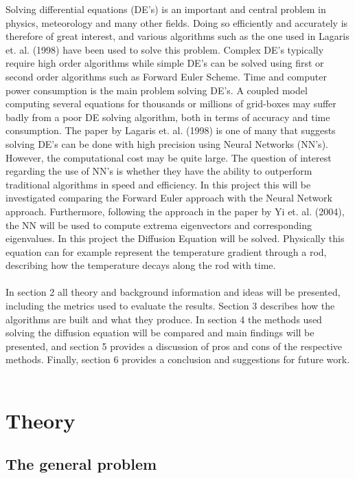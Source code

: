 \documentclass[a4paper,11pt,twocolumn]{article}
\begin{document}
Solving differential equations (DE's) is an important and central problem in physics, meteorology and many other fields. Doing so efficiently and accurately is therefore of great interest, and various algorithms such as the one used in Lagaris et. al. (1998)\cite{lagaris} have been used to solve this problem. Complex DE's typically require high order algorithms while simple DE's can be solved using first or second order algorithms such as Forward Euler Scheme. Time and computer power consumption is the main problem solving DE's. A coupled model computing several equations for thousands or millions of grid-boxes may suffer badly from a poor DE solving algorithm, both in terms of accuracy and time consumption. The paper by Lagaris et. al. (1998)\cite{lagaris} is one of many that suggests solving DE's can be done with high precision using Neural Networks (NN's). However, the computational cost may be quite large. 
The question of interest regarding the use of NN's is whether they have the ability to outperform traditional algorithms in speed and efficiency. In this project this will be investigated comparing the Forward Euler approach with the Neural Network approach. Furthermore, following the approach in the paper by Yi et. al. (2004)\cite{yi}, the NN will be used to compute extrema eigenvectors and corresponding eigenvalues. In this project the Diffusion Equation will be solved. Physically this equation can for example represent the temperature gradient through a rod, describing how the temperature decays along the rod with time.  
\\
\\
In section 2 all theory and background information and ideas will be presented, including the metrics used to evaluate the results. Section 3 describes how the algorithms are built and what they produce. In section 4 the methods used solving the diffusion equation will be compared and main findings will be presented, and section 5 provides a discussion of pros and cons of the respective methods. Finally, section 6 provides a conclusion and suggestions for future work.   
\
\section{Theory}

\subsection{The general problem}
\end{document}
